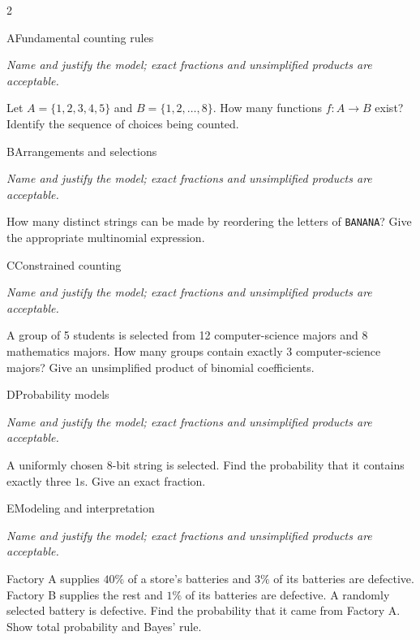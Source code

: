 \documentclass[9pt]{extarticle}
\begin{document}
\begin{multicols}{2}
\begin{CoreProblem}{A}{Fundamental counting rules}
{\scriptsize\textit{Name and justify the model; exact fractions and unsimplified products are acceptable.}\par}
Let $A=\{1,2,3,4,5\}$ and $B=\{1,2,\ldots,8\}$. How many functions
    $f:A\to B$ exist? Identify the sequence of choices being counted.
\end{CoreProblem}
\begin{CoreProblem}{B}{Arrangements and selections}
{\scriptsize\textit{Name and justify the model; exact fractions and unsimplified products are acceptable.}\par}
How many distinct strings can be made by reordering the letters of
    \texttt{BANANA}? Give the appropriate multinomial expression.
\end{CoreProblem}
\begin{CoreProblem}{C}{Constrained counting}
{\scriptsize\textit{Name and justify the model; exact fractions and unsimplified products are acceptable.}\par}
A group of 5 students is selected from 12 computer-science majors and
    8 mathematics majors. How many groups contain exactly 3 computer-science
    majors? Give an unsimplified product of binomial coefficients.
\end{CoreProblem}
\columnbreak
\begin{CoreProblem}{D}{Probability models}
{\scriptsize\textit{Name and justify the model; exact fractions and unsimplified products are acceptable.}\par}
A uniformly chosen 8-bit string is selected. Find the probability
    that it contains exactly three $1$s. Give an exact fraction.
\end{CoreProblem}
\begin{CoreProblem}{E}{Modeling and interpretation}
{\scriptsize\textit{Name and justify the model; exact fractions and unsimplified products are acceptable.}\par}
Factory A supplies $40\%$ of a store's batteries and $3\%$ of its
    batteries are defective. Factory B supplies the rest and $1\%$ of its
    batteries are defective. A randomly selected battery is defective. Find the
    probability that it came from Factory A. Show total probability and Bayes'
    rule.
\end{CoreProblem}
\end{multicols}
\CoreWorkArea
\FormBreak
{}
\end{document}
